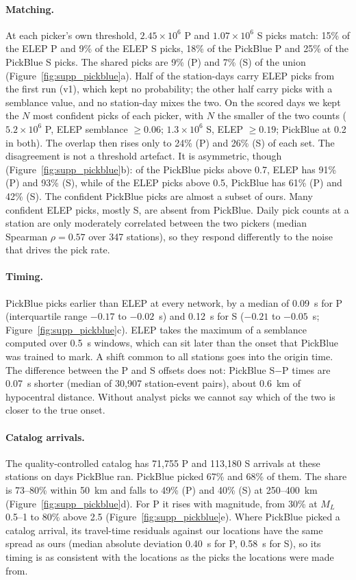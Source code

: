 \documentclass[]{seismica}
\begin{document}
\paragraph{Matching.} At each picker's own threshold, $2.45\times10^{6}$ P and
$1.07\times10^{6}$ S picks match: 15\% of the ELEP P and 9\% of the ELEP S picks, 18\%
of the PickBlue P and 25\% of the PickBlue S picks. The shared picks are 9\% (P) and
7\% (S) of the union (Figure~\ref{fig:supp_pickblue}a). Half of the station-days carry
ELEP picks from the first run (v1), which kept no probability; the other half carry
picks with a semblance value, and no station-day mixes the two. On the scored days we
kept the $N$ most confident picks of each picker, with $N$ the smaller of the two
counts ($5.2\times10^{6}$ P, ELEP semblance $\ge0.06$; $1.3\times10^{6}$ S, ELEP
$\ge0.19$; PickBlue at 0.2 in both). The overlap then rises only to 24\% (P) and 26\%
(S) of each set. The disagreement is not a threshold artefact. It is asymmetric,
though (Figure~\ref{fig:supp_pickblue}b): of the PickBlue picks above 0.7, ELEP has
91\% (P) and 93\% (S), while of the ELEP picks above 0.5, PickBlue has 61\% (P) and 42\%
(S). The confident PickBlue picks are almost a subset of ours. Many confident ELEP
picks, mostly S, are absent from PickBlue. Daily pick counts at a station are only
moderately correlated between the two pickers (median Spearman $\rho=0.57$ over 347
stations), so they respond differently to the noise that drives the pick rate.

\paragraph{Timing.} PickBlue picks earlier than ELEP at every network, by a median of
0.09~s for P (interquartile range $-0.17$ to $-0.02$~s) and 0.12~s for S ($-0.21$ to
$-0.05$~s; Figure~\ref{fig:supp_pickblue}c). ELEP takes the maximum of a semblance
computed over 0.5~s windows, which can sit later than the onset that PickBlue was
trained to mark. A shift common to all stations goes into the origin time. The
difference between the P and S offsets does not: PickBlue S$-$P times are 0.07~s
shorter (median of 30,907 station-event pairs), about 0.6~km of hypocentral distance.
Without analyst picks we cannot say which of the two is closer to the true onset.

\paragraph{Catalog arrivals.} The quality-controlled catalog has 71,755 P and 113,180
S arrivals at these stations on days PickBlue ran. PickBlue picked 67\% and 68\% of
them. The share is 73--80\% within 50~km and falls to 49\% (P) and 40\% (S) at
250--400~km (Figure~\ref{fig:supp_pickblue}d). For P it rises with magnitude, from 30\%
at $M_L$ 0.5--1 to 80\% above 2.5 (Figure~\ref{fig:supp_pickblue}e). Where PickBlue
picked a catalog arrival, its travel-time residuals against our locations have the
same spread as ours (median absolute deviation 0.40~s for P, 0.58~s for S), so its
timing is as consistent with the locations as the picks the locations were made from.
\end{document}

